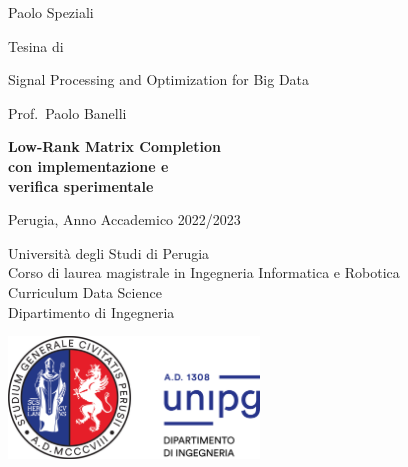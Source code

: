 \documentclass[12pt,a4paper]{report}
\begin{document}
\begin{titlepage}

{\Large \noindent Paolo Speziali} \newline

\vspace{1cm}

{\begin{flushleft}

  {\normalsize \noindent Tesina di}
  \vspace{0.2cm}
  
  {\Large \noindent Signal Processing and Optimization for Big Data}

  \vspace{0.2cm}
  
  {\large \noindent Prof.~Paolo Banelli}

  \vspace{2cm}

  \fontsize{21.8}{26.16} \selectfont \bfseries \noindent 
  Low-Rank Matrix Completion \\
  con implementazione e \\ 
  verifica sperimentale \\
  \end{flushleft}}
  
  \vspace{4cm}


\noindent Perugia, Anno Accademico 2022/2023

\noindent Università degli Studi di Perugia \\
Corso di laurea magistrale in Ingegneria Informatica e Robotica \\
Curriculum Data Science \\
Dipartimento di Ingegneria

\vspace{0.7cm}

\noindent \includegraphics[width=0.5\textwidth]{Figures/logounipg2021}
\restoregeometry
\end{titlepage}
\normalfont
\newpage \thispagestyle{empty} \ \newpage
\onehalfspacing
\tableofcontents
\end{document}
